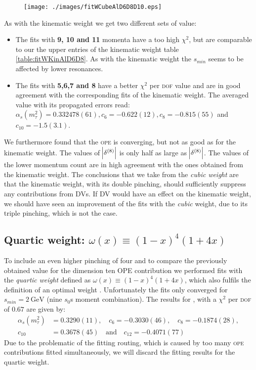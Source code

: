 \documentclass[../../index.tex]{subfiles}
\begin{document}
\begin{figure}
  \centering
  \texttt{[image: ./images/fitWCubeAlD6D8D10.eps]}
  \label{fig:fitWCubeAlpha}
\end{figure}
As with the kinematic weight we get two different sets of value:
\begin{itemize}
  \item The fits with \textbf{9, 10 and 11} momenta have a too high $\chi^2$,
    but are comparable to our the upper entries of the kinematic weight table
    \cref{table:fitWKinAlD6D8}. As with the kinematic weight the $s_{min}$ seems
    to be affected by lower resonances.
  \item The fits with \textbf{5,6,7 and 8} have a better $\chi^2$ per
    \textsc{dof} value and are in good agreement with the corresponding fits of
    the kinematic weight. The averaged value with its propagated errors read:
    $\alpha_s(m_\tau^2)=0.332478(61), c_6=-0.622(12), c_8=-0.815(55)$ and $c_{10}=-1.5(3.1)$.
\end{itemize}
We furthermore found that the \textsc{ope} is converging, but not as good as for
the kinematic weight. The values of $\abs{\delta^{(8)}}$ is only half as large
as $\abs{\delta^{(8)}}$.
The values of the lower momentum count are in high agreement with the
ones obtained from the kinematic weight. The
conclusions that we take from the \textit{cubic weight} are that the kinematic
weight, with its double pinching, should sufficiently suppress any contributions
from \textsc{DV}s. If \textsc{DV} would have an effect on the kinematic weight,
we should have seen an improvement of the fits with the \textit{cubic} weight,
due to its triple pinching, which is not the case.

\subsection{Quartic weight: $\omega(x) \equiv (1-x)^4(1+4x)$}
\label{sec:quarticWeight}
To include an even higher pinching of four and to compare the previously
obtained value for the dimension ten \textsc{OPE} contribution we performed fits
with the \textit{quartic weight} defined as $\omega(x) \equiv (1-x)^4(1+4x)$,
which also fulfils the definition of an optimal weight \cite{Beneke2012}. 
Unfortunately the fits only converged for $s_{min}=\SI{2}{\giga\eV}$ (nine $s_0$s
moment combination). The results for , with a $\chi^2$ per \textsc{dof} of $0.67$ are given by:
\begin{equation}
  \begin{split}
  \alpha_s(m_\tau^2) &= 0.3290(11), \quad c_6=-0.3030(46), \quad c_8=-0.1874(28), \\
  c_{10} &= 0.3678(45) \quad \text{and} \quad c_{12}=-0.4071(77)
  \end{split}
\end{equation}
Due to the problematic of the fitting routing, which is caused by too many
\textsc{ope} contributions fitted simultaneously, we will discard the fitting
results for the quartic weight.
\end{document}
